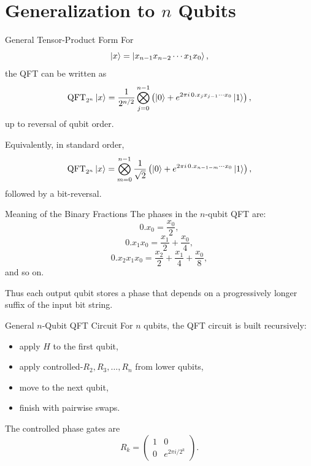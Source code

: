 \documentclass{beamer}
\begin{document}
\section{Generalization to \(n\) Qubits}

\begin{frame}{General Tensor-Product Form}
For
\[
\ket{x}=\ket{x_{n-1}x_{n-2}\cdots x_1x_0},
\]
the QFT can be written as
\[
\mathrm{QFT}_{2^n}\ket{x}
=
\frac{1}{2^{n/2}}
\bigotimes_{j=0}^{n-1}
\left(
\ket{0}
+
e^{2\pi i\,0.x_jx_{j-1}\cdots x_0}\ket{1}
\right),
\]
up to reversal of qubit order.

Equivalently, in standard order,
\[
\mathrm{QFT}_{2^n}\ket{x}
=
\bigotimes_{m=0}^{n-1}
\frac{1}{\sqrt{2}}
\left(
\ket{0}
+
e^{2\pi i\,0.x_{n-1-m}\cdots x_0}\ket{1}
\right),
\]
followed by a bit-reversal.
\end{frame}


\begin{frame}{Meaning of the Binary Fractions}
The phases in the \(n\)-qubit QFT are:
\[
0.x_0 = \frac{x_0}{2},
\]
\[
0.x_1x_0 = \frac{x_1}{2}+\frac{x_0}{4},
\]
\[
0.x_2x_1x_0 = \frac{x_2}{2}+\frac{x_1}{4}+\frac{x_0}{8},
\]
and so on.

Thus each output qubit stores a phase that depends on a progressively longer suffix of the input bit string.
\end{frame}


\begin{frame}{General \(n\)-Qubit QFT Circuit}
For \(n\) qubits, the QFT circuit is built recursively:
\begin{itemize}
\item apply \(H\) to the first qubit,
\item apply controlled-\(R_2, R_3,\dots,R_n\) from lower qubits,
\item move to the next qubit,
\item finish with pairwise swaps.
\end{itemize}

The controlled phase gates are
\[
R_k=
\begin{pmatrix}
1 & 0 \\
0 & e^{2\pi i/2^k}
\end{pmatrix}.
\]
\end{frame}
\end{document}
